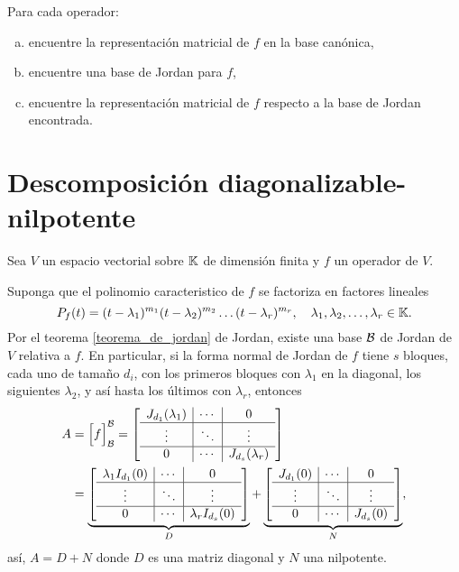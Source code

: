 Para cada operador:
\begin{enumerate}[(a)]
\item encuentre la representaci\'on matricial de $f$ en la base can\'onica,
\item encuentre una base de Jordan para $f$,
\item encuentre la representaci\'on matricial de $f$ respecto a la base de Jordan encontrada.
\end{enumerate}

\section{Descomposición diagonalizable-nilpotente}

Sea $V$ un espacio vectorial sobre $\mathbb{K}$ de dimensión finita y $f$ un operador de $V$.

Suponga que el polinomio caracteristico de $f$ se factoriza en factores lineales
\[
P_f(t)=(t-\lambda_1)^{m_1}(t-\lambda_2)^{m_2}\ldots(t-\lambda_r)^{m_r}, \quad \lambda_1,\lambda_2,\ldots,\lambda_r\in \mathbb{K}.
\]
Por el teorema \ref{teorema_de_jordan} de Jordan, existe una base $\mathcal{B}$ de Jordan de $V$ relativa a $f$. En particular, si la forma normal de Jordan de $f$ tiene $s$ bloques, cada uno de tamaño $d_i$, con los primeros bloques con $\lambda_1$ en la diagonal, los siguientes $\lambda_2$, y así hasta los últimos con $\lambda_r$, entonces
\begin{align*}
  A & =\Big[f\Big]^{\mathcal{B}}_{\mathcal{B}}=
  \left[\begin{array}{c|c|c}
    J_{d_1}(\lambda_1) & \cdots & 0\\
    \hline
    \vdots & \ddots & \vdots\\
    \hline
    0 & \cdots & J_{d_s}(\lambda_r)
  \end{array}\right]\\
   & =
  \underbrace{\left[\begin{array}{c|c|c}
    \lambda_1I_{d_1}(0) & \cdots & 0\\
    \hline
    \vdots & \ddots & \vdots\\
    \hline
    0 & \cdots & \lambda_rI_{d_s}(0)
  \end{array}\right]}_D+
  \underbrace{\left[\begin{array}{c|c|c}
    J_{d_1}(0) & \cdots & 0\\
    \hline
    \vdots & \ddots & \vdots\\
    \hline
    0 & \cdots & J_{d_s}(0)
  \end{array}\right]}_N,
\end{align*}
así, $A=D+N$ donde $D$ es una matriz diagonal y $N$ una nilpotente.

